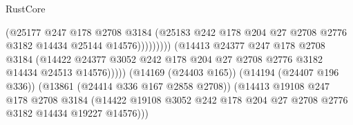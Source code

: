 \begin{lexlean}{RustCore}
\begin{coremodule}
                                                (@25177
                                                  @247
                                                  @178
                                                  @2708
                                                  @3184
                                                  (@25183
                                                    @242
                                                    @178
                                                    @204
                                                    @27
                                                    @2708
                                                    @2776
                                                    @3182
                                                    @14434
                                                    @25144
                                                    @14576)))))))))
                                  (@14413
                                    @24377
                                    @247
                                    @178
                                    @2708
                                    @3184
                                    (@14422
                                      @24377
                                      @3052
                                      @242
                                      @178
                                      @204
                                      @27
                                      @2708
                                      @2776
                                      @3182
                                      @14434
                                      @24513
                                      @14576)))))
                            (@14169 (@24403 @165))
                            (@14194 (@24407 @196 @336))
                            (@13861 (@24414 @336 @167 @2858 @2708))
                            (@14413
                              @19108
                              @247
                              @178
                              @2708
                              @3184
                              (@14422
                                @19108
                                @3052
                                @242
                                @178
                                @204
                                @27
                                @2708
                                @2776
                                @3182
                                @14434
                                @19227
                                @14576)))

\end{coremodule}
\end{lexlean}
